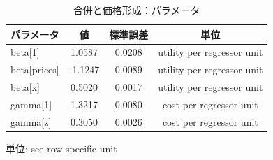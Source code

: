 \begingroup
\begin{table}[htbp]
\centering
\caption{合併と価格形成：パラメータ}
\label{tab:specialist-blp-supply-r01-displays-parameters}
\begin{tabular}{lccc}
\toprule
パラメータ & 値 & 標準誤差 & 単位 \\
\midrule
beta[1] & 1.0587 & 0.0208 & utility per regressor unit \\
beta[prices] & -1.1247 & 0.0089 & utility per regressor unit \\
beta[x] & 0.5020 & 0.0017 & utility per regressor unit \\
gamma[1] & 1.3217 & 0.0080 & cost per regressor unit \\
gamma[z] & 0.3050 & 0.0026 & cost per regressor unit \\
\bottomrule
\end{tabular}
\par\medskip\begin{minipage}{\linewidth}\footnotesize
単位: see row-specific unit
\end{minipage}
\end{table}
\endgroup
